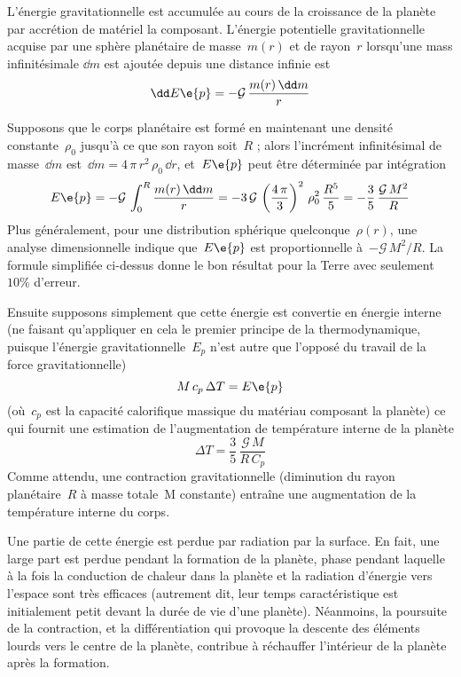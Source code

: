 \sk
L'énergie gravitationnelle est accumulée au cours de la croissance de la planète
par accrétion de matériel la composant.
L'énergie potentielle gravitationnelle acquise par une sphère planétaire
de masse~$m(r)$ et de rayon~$r$ lorsqu'une mass infinitésimale $\dd m$
est ajoutée depuis une distance infinie
est
\[ \dd E\e{p} = - \mathcal{G} \, \frac{m(r) \, \dd m}{r}  \]

\sk
Supposons que le corps planétaire est formé en maintenant une densité constante~$\rho_0$
jusqu'à ce que son rayon soit~$R$ ; alors l'incrément infinitésimal de masse~$\dd m$
est~$\dd m = 4 \, \pi \, r^2 \, \rho_0 \, \dd r$, et~$E\e{p}$ peut être déterminée par
intégration
\[ E\e{p} = - \mathcal{G} \, \int_{0}^{R} \frac{m(r) \, \dd m}{r}  
= - 3 \, \mathcal{G} \, \left( \frac{4\,\pi}{3} \right)^2 \, \rho_0^2 \, \frac{R^5}{5}
= - \frac{3}{5} \, \frac{\mathcal{G}\,M^2}{R} \] 
\noindent Plus généralement, pour une distribution sphérique quelconque~$\rho(r)$,
une analyse dimensionnelle indique que~$E\e{p}$ est proportionnelle à~$-\mathcal{G}\,M^2/R$.
La formule simplifiée ci-dessus donne le bon résultat pour la Terre avec seulement~$10\%$ d'erreur.

\sk
Ensuite supposons simplement que cette énergie est convertie en énergie interne
(ne faisant qu'appliquer en cela le premier principe de la thermodynamique, puisque
l'énergie gravitationnelle~$E_p$ n'est autre que l'opposé du travail de la force gravitationnelle)
\[ M \, c_p \, \Delta T = E\e{p} \]
\noindent (où~$c_p$ est la capacité calorifique massique du matériau composant la planète)
ce qui fournit une estimation de l'augmentation de température interne de la planète
\[ \Delta T = \frac{3}{5} \, \frac{\mathcal{G}\,M}{R\,C_p} \]
\noindent Comme attendu, une contraction gravitationnelle 
(diminution du rayon planétaire~$R$ à masse totale~M constante)
entraîne une augmentation de la température interne du corps.

\sk
Une partie de cette énergie est perdue par radiation par la surface.
En fait, une large part est perdue pendant la formation de la planète,
phase pendant laquelle à la fois 
la conduction de chaleur dans la planète
et la radiation d'énergie vers l'espace
sont très efficaces (autrement dit, leur temps caractéristique
est initialement petit devant la durée de vie d'une planète).
Néanmoins, la poursuite de la contraction,
et la différentiation qui provoque la descente
des éléments lourds vers le centre de la planète,
contribue à réchauffer l'intérieur de la planète
après la formation.

